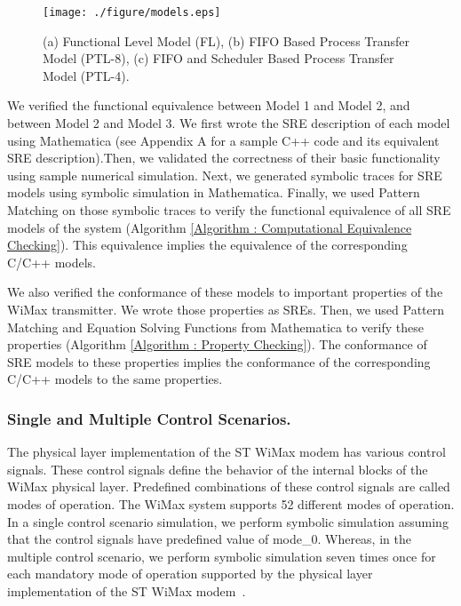 \documentclass[submission,copyright,creativecommons]{eptcs}
\begin{document}
\begin{figure}[!htb]
\centering
\texttt{[image: ./figure/models.eps]}
\caption{\small{(a) Functional Level Model (FL), (b) FIFO Based Process Transfer Model (PTL-8), (c) FIFO and Scheduler Based Process Transfer Model (PTL-4).}}
\label{Figure_WiMax_Models}
\end{figure}

We verified the functional equivalence between Model 1 and Model 2, and between Model 2 and Model 3. We first wrote the SRE description of each model using Mathematica (see Appendix A for a sample C++ code and its equivalent SRE description).Then, we validated the correctness of their basic functionality using sample numerical simulation. Next, we generated symbolic traces for SRE models using symbolic simulation in Mathematica. Finally, we used Pattern Matching on those symbolic traces to verify the functional equivalence of all SRE models of the system (Algorithm \ref{Algorithm : Computational Equivalence Checking}). This equivalence implies the equivalence of the corresponding C/C++ models.

We also verified the conformance of these models to important properties of the WiMax transmitter. We wrote those properties as SREs. Then, we used Pattern Matching and Equation Solving Functions from Mathematica to verify these properties (Algorithm \ref{Algorithm : Property Checking}). The conformance of SRE models to these properties implies the conformance of the corresponding C/C++ models to the same properties.

\subsubsection{Single and Multiple Control Scenarios.}

 The physical layer implementation of the ST WiMax modem has various  control signals. These control signals define the behavior of the internal blocks of the WiMax physical layer. Predefined combinations of these control signals are called modes of operation. The WiMax system supports 52 different modes of operation. In a single control scenario simulation,  we perform symbolic simulation assuming that the control signals have predefined value of mode\_0. Whereas, in the multiple control scenario, we perform symbolic simulation seven times once for each mandatory mode of operation supported by the physical layer implementation of the ST WiMax modem~\cite{39,40}.
\end{document}
